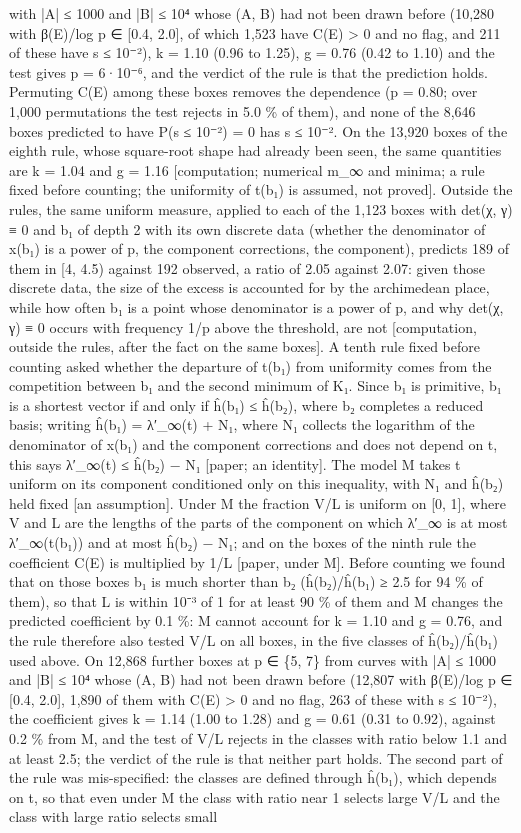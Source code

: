 \documentclass[11pt,a4paper]{article}
\theoremstyle{named}
\begin{document}
with |A| ≤ 1000 and |B| ≤ 10⁴ whose (A, B) had not been drawn before (10,280 with β(E)/log p ∈ [0.4, 2.0], of which 1,523 have C(E) \textgreater{} 0 and no flag, and 211 of these have s ≤ 10⁻²), k = 1.10 (0.96 to 1.25), g = 0.76 (0.42 to 1.10) and the test gives p = 6·10⁻⁶, and the verdict of the rule is that the prediction holds. Permuting C(E) among these boxes removes the dependence (p = 0.80; over 1,000 permutations the test rejects in 5.0 \% of them), and none of the 8,646 boxes predicted to have P(s ≤ 10⁻²) = 0 has s ≤ 10⁻². On the 13,920 boxes of the eighth rule, whose square-root shape had already been seen, the same quantities are k = 1.04 and g = 1.16 [computation; numerical m\_∞ and minima; a rule fixed before counting; the uniformity of t(b₁) is assumed, not proved]. Outside the rules, the same uniform measure, applied to each of the 1,123 boxes with det(χ, γ) ≡ 0 and b₁ of depth 2 with its own discrete data (whether the denominator of x(b₁) is a power of p, the component corrections, the component), predicts 189 of them in [4, 4.5) against 192 observed, a ratio of 2.05 against 2.07: given those discrete data, the size of the excess is accounted for by the archimedean place, while how often b₁ is a point whose denominator is a power of p, and why det(χ, γ) ≡ 0 occurs with frequency 1/p above the threshold, are not [computation, outside the rules, after the fact on the same boxes]. A tenth rule fixed before counting asked whether the departure of t(b₁) from uniformity comes from the competition between b₁ and the second minimum of K₁. Since b₁ is primitive, b₁ is a shortest vector if and only if ĥ(b₁) ≤ ĥ(b₂), where b₂ completes a reduced basis; writing ĥ(b₁) = λ′\_∞(t) + N₁, where N₁ collects the logarithm of the denominator of x(b₁) and the component corrections and does not depend on t, this says λ′\_∞(t) ≤ ĥ(b₂) − N₁ [paper; an identity]. The model M takes t uniform on its component conditioned only on this inequality, with N₁ and ĥ(b₂) held fixed [an assumption]. Under M the fraction V/L is uniform on [0, 1], where V and L are the lengths of the parts of the component on which λ′\_∞ is at most λ′\_∞(t(b₁)) and at most ĥ(b₂) − N₁; and on the boxes of the ninth rule the coefficient C(E) is multiplied by 1/L [paper, under M]. Before counting we found that on those boxes b₁ is much shorter than b₂ (ĥ(b₂)/ĥ(b₁) ≥ 2.5 for 94 \% of them), so that L is within 10⁻³ of 1 for at least 90 \% of them and M changes the predicted coefficient by 0.1 \%: M cannot account for k = 1.10 and g = 0.76, and the rule therefore also tested V/L on all boxes, in the five classes of ĥ(b₂)/ĥ(b₁) used above. On 12,868 further boxes at p ∈ \{5, 7\} from curves with |A| ≤ 1000 and |B| ≤ 10⁴ whose (A, B) had not been drawn before (12,807 with β(E)/log p ∈ [0.4, 2.0], 1,890 of them with C(E) \textgreater{} 0 and no flag, 263 of these with s ≤ 10⁻²), the coefficient gives k = 1.14 (1.00 to 1.28) and g = 0.61 (0.31 to 0.92), against 0.2 \% from M, and the test of V/L rejects in the classes with ratio below 1.1 and at least 2.5; the verdict of the rule is that neither part holds. The second part of the rule was mis-specified: the classes are defined through ĥ(b₁), which depends on t, so that even under M the class with ratio near 1 selects large V/L and the class with large ratio selects small 
\end{document}
